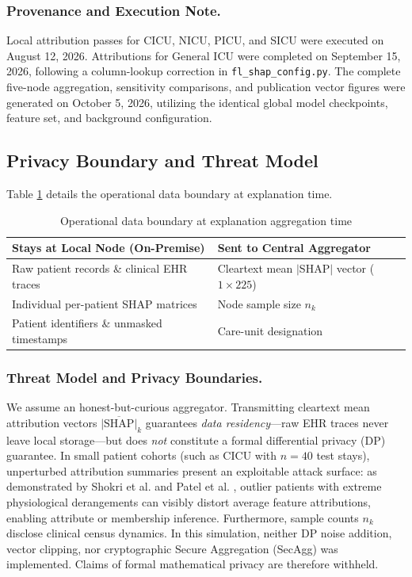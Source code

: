 \documentclass[runningheads]{llncs}
\begin{document}
\subsubsection{Provenance and Execution Note.}
Local attribution passes for CICU, NICU, PICU, and SICU were executed on August 12, 2026. Attributions for General ICU were completed on September 15, 2026, following a column-lookup correction in \texttt{fl\_shap\_config.py}. The complete five-node aggregation, sensitivity comparisons, and publication vector figures were generated on October 5, 2026, utilizing the identical global model checkpoints, feature set, and background configuration.

\subsection{Privacy Boundary and Threat Model}
Table \ref{tab:privacy} details the operational data boundary at explanation time.

\begin{table}[t]
\caption{Operational data boundary at explanation aggregation time}
\label{tab:privacy}
\centering
\small
\begin{tabular}{ll}
\toprule
\textbf{Stays at Local Node (On-Premise)} & \textbf{Sent to Central Aggregator} \\
\midrule
Raw patient records \& clinical EHR traces     & Cleartext mean $|$SHAP$|$ vector ($1\times 225$) \\
Individual per-patient SHAP matrices           & Node sample size $n_k$ \\
Patient identifiers \& unmasked timestamps     & Care-unit designation \\
\bottomrule
\end{tabular}
\end{table}

\subsubsection{Threat Model and Privacy Boundaries.}
We assume an honest-but-curious aggregator. Transmitting cleartext mean attribution vectors $\overline{|\text{SHAP}|}_k$ guarantees \emph{data residency}---raw EHR traces never leave local storage---but does \emph{not} constitute a formal differential privacy (DP) guarantee. In small patient cohorts (such as CICU with $n=40$ test stays), unperturbed attribution summaries present an exploitable attack surface: as demonstrated by Shokri et al. \cite{shokri2021privacy} and Patel et al. \cite{patel2022model}, outlier patients with extreme physiological derangements can visibly distort average feature attributions, enabling attribute or membership inference. Furthermore, sample counts $n_k$ disclose clinical census dynamics. In this simulation, neither DP noise addition, vector clipping, nor cryptographic Secure Aggregation (SecAgg) \cite{bonawitz2017practical} was implemented. Claims of formal mathematical privacy are therefore withheld.
\end{document}
